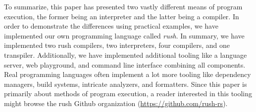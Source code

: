 To summarize, this paper has presented two vastly different means of program execution,
the former being an interpreter and the latter being a compiler.
In order to demonstrate the differences using practical examples,
we have implemented our own programming language called \emph{rush}.
In summary, we have implemented two rush compilers, two interpreters, four compilers, and one transpiler.
Additionally, we have implemented additional tooling like a language server, web playground, and command line interface combining all components.
Real programming languages often implement a lot more tooling like dependency managers, build systems, intricate analyzers, and formatters.
Since this paper is primarily about methods of program execution, a reader interested in this tooling might browse the rush Github organization (\url{https://github.com/rush-rs}).
